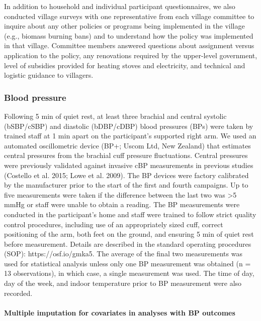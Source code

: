 \documentclass[
  letterpaper,
  DIV=11,
  numbers=noendperiod]{scrartcl}
\let\oldparagraph\paragraph
\renewcommand{\paragraph}[1]{\oldparagraph{#1}\mbox{}}
\begin{document}
In addition to household and individual participant questionnaires, we
also conducted village surveys with one representative from each village
committee to inquire about any other policies or programs being
implemented in the village (e.g., biomass burning bans) and to
understand how the policy was implemented in that village. Committee
members answered questions about assignment versus application to the
policy, any renovations required by the upper-level government, level of
subsidies provided for heating stoves and electricity, and technical and
logistic guidance to villagers.

\hypertarget{blood-pressure}{%
\subsubsection{Blood pressure}\label{blood-pressure}}

Following 5 min of quiet rest, at least three brachial and central
systolic (bSBP/cSBP) and diastolic (bDBP/cDBP) blood pressures (BPs)
were taken by trained staff at 1 min apart on the participant's
supported right arm. We used an automated oscillometric device (BP+;
Uscom Ltd, New Zealand) that estimates central pressures from the
brachial cuff pressure fluctuations. Central pressures were previously
validated against invasive cBP measurements in previous studies
(Costello et al. 2015; Lowe et al. 2009). The BP devices were factory
calibrated by the manufacturer prior to the start of the first and
fourth campaigns. Up to five measurements were taken if the difference
between the last two was \textgreater5 mmHg or staff were unable to
obtain a reading. The BP measurements were conducted in the
participant's home and staff were trained to follow strict quality
control procedures, including use of an appropriately sized cuff,
correct positioning of the arm, both feet on the ground, and ensuring 5
min of quiet rest before measurement. Details are described in the
standard operating procedures (SOP): https://osf.io/gmka5. The average
of the final two measurements was used for statistical analysis unless
only one BP measurement was obtained (n = 13 observations), in which
case, a single measurement was used. The time of day, day of the week,
and indoor temperature prior to BP measurement were also recorded.

\hypertarget{multiple-imputation-for-covariates-in-analyses-with-bp-outcomes}{%
\paragraph{Multiple imputation for covariates in analyses with BP
outcomes}\label{multiple-imputation-for-covariates-in-analyses-with-bp-outcomes}}
\end{document}
